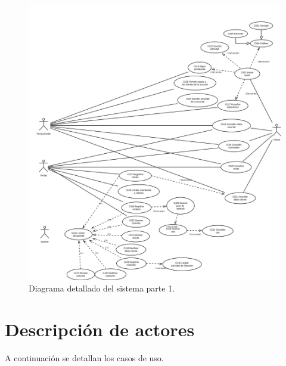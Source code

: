\begin{figure}[htbp]
	\begin{center}
		\includegraphics[angle=90, width=1.1\textwidth]{images/CUcompleto2}
		\caption{Diagrama detallado del sistema parte 1.}
		\label{fig:CUcompleto2}
	\end{center}
\end{figure}

\section{Descripción de actores}


A continuación se detallan los casos de uso.










